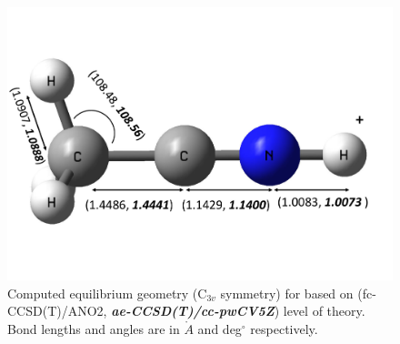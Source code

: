 \begin{figure}
	\centering
		\includegraphics[scale=.3]{chapters/CH3CNH+/figures/molecule.pdf}
		\caption{Computed equilibrium geometry (C$_{3v}$ symmetry) for \pa based on (fc-CCSD(T)/ANO2, \textbf{\textit{ae-CCSD(T)/cc-pwCV5Z}}) level of theory. Bond lengths and angles are in $\mathring{A}$ and deg$^{\circ}$ respectively.}
	\label{FIG:molecule}
\end{figure}

